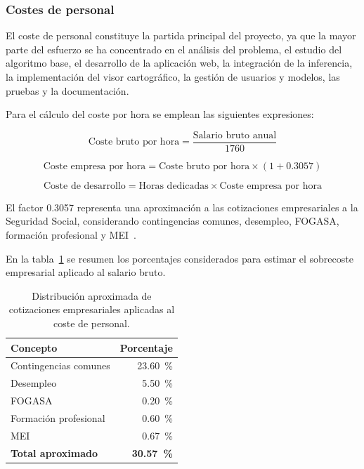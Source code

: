 \subsubsection{Costes de personal}

El coste de personal constituye la partida principal del proyecto, ya que la mayor parte del esfuerzo se ha concentrado en el análisis del problema, el estudio del algoritmo base, el desarrollo de la aplicación web, la integración de la inferencia, la implementación del visor cartográfico, la gestión de usuarios y modelos, las pruebas y la documentación.

Para el cálculo del coste por hora se emplean las siguientes expresiones:

\begin{equation}
	\text{Coste bruto por hora} =
	\frac{\text{Salario bruto anual}}{\num{1760}}
\end{equation}

\begin{equation}
	\text{Coste empresa por hora} =
	\text{Coste bruto por hora} \times (1 + \num{0.3057})
\end{equation}

\begin{equation}
	\text{Coste de desarrollo} =
	\text{Horas dedicadas} \times \text{Coste empresa por hora}
\end{equation}

El factor \num{0.3057} representa una aproximación a las cotizaciones empresariales a la Seguridad Social, considerando contingencias comunes, desempleo, FOGASA, formación profesional y MEI~\cite{seguridad_social_bases_tipos_cotizacion_2026}.

En la tabla~\ref{tab:cotizaciones_empresa} se resumen los porcentajes considerados para estimar el sobrecoste empresarial aplicado al salario bruto.

\begin{table}[]
	\centering
	\renewcommand{\arraystretch}{1.25}
	
	\begin{tabular}{l r}
		\toprule
		\textbf{Concepto} & \textbf{Porcentaje} \\
		\midrule
		Contingencias comunes & \qty{23.60}{\percent} \\
		Desempleo & \qty{5.50}{\percent} \\
		FOGASA & \qty{0.20}{\percent} \\
		Formación profesional & \qty{0.60}{\percent} \\
		MEI & \qty{0.67}{\percent} \\
		\midrule
		\textbf{Total aproximado} & \textbf{\qty{30.57}{\percent}} \\
		\bottomrule
	\end{tabular}
	
	\caption{Distribución aproximada de cotizaciones empresariales aplicadas al coste de personal.}
	\label{tab:cotizaciones_empresa}
\end{table}

